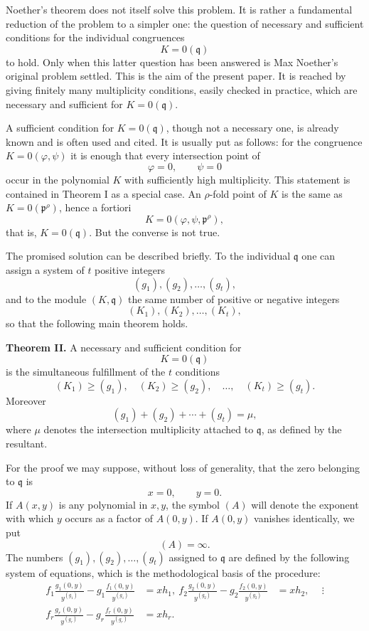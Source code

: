 \documentclass[12pt]{article}
\begin{document}
Noether's theorem does not itself solve this problem. It is rather a fundamental reduction of the problem to a simpler one: the question of necessary and sufficient conditions for the individual congruences
\[
  K=0(\mathfrak q)
\]
to hold. Only when this latter question has been answered is Max Noether's original problem settled. This is the aim of the present paper. It is reached by giving finitely many multiplicity conditions, easily checked in practice, which are necessary and sufficient for \(K=0(\mathfrak q)\).

A sufficient condition for \(K=0(\mathfrak q)\), though not a necessary one, is already known and is often used and cited. It is usually put as follows: for the congruence \(K=0(\varphi,\psi)\) it is enough that every intersection point of
\[
  \varphi=0,\qquad \psi=0
\]
occur in the polynomial \(K\) with sufficiently high multiplicity. This statement is contained in Theorem I as a special case. An \(\rho\)-fold point of \(K\) is the same as \(K=0(\mathfrak p^\rho)\), hence a fortiori
\[
  K=0(\varphi,\psi,\mathfrak p^{\rho}),
\]
that is, \(K=0(\mathfrak q)\). But the converse is not true.

The promised solution can be described briefly. To the individual \(\mathfrak q\) one can assign a system of \(t\) positive integers
\[
  (g_1),(g_2),\ldots,(g_t),
\]
and to the module \((K,\mathfrak q)\) the same number of positive or negative integers
\[
  (K_1),(K_2),\ldots,(K_t),
\]
so that the following main theorem holds.

\textbf{Theorem II.} A necessary and sufficient condition for
\[
  K=0(\mathfrak q)
\]
is the simultaneous fulfillment of the \(t\) conditions
\[
  (K_1)\ge (g_1),\quad
  (K_2)\ge (g_2),\quad \ldots,\quad
  (K_t)\ge (g_t).
\]
Moreover
\[
  (g_1)+(g_2)+\cdots+(g_t)=\mu,
\]
where \(\mu\) denotes the intersection multiplicity attached to \(\mathfrak q\), as defined by the resultant.

For the proof we may suppose, without loss of generality, that the zero belonging to \(\mathfrak q\) is
\[
  x=0,
  \qquad
  y=0.
\]
If \(A(x,y)\) is any polynomial in \(x,y\), the symbol \((A)\) will denote the exponent with which \(y\) occurs as a factor of \(A(0,y)\). If \(A(0,y)\) vanishes identically, we put
\[
  (A)=\infty.
\]
The numbers \((g_1),(g_2),\ldots,(g_t)\) assigned to \(\mathfrak q\) are defined by the following system of equations, which is the methodological basis of the procedure:
\[
\begin{aligned}
  f_1\frac{g_1(0,y)}{y^{(g_1)}}
     -g_1\frac{f_1(0,y)}{y^{(g_1)}} &= xh_1,\
  f_2\frac{g_2(0,y)}{y^{(g_2)}}
     -g_2\frac{f_2(0,y)}{y^{(g_2)}} &= xh_2,\
  &\ \vdots \\
  f_r\frac{g_r(0,y)}{y^{(g_r)}}
     -g_r\frac{f_r(0,y)}{y^{(g_r)}} &= xh_r.
\end{aligned}
\tag{1}
\]
\end{document}
